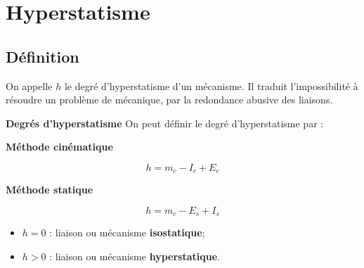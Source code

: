 \section{Hyperstatisme}
\subsection{Définition}
On appelle $h$ le degré d'hyperstatisme d'un mécanisme.
			Il traduit l'impossibilité à résoudre un problème de mécanique, par la redondance abusive des liaisons.
			
\begin{defi}\small{\textbf{\textsf{Degrés d'hyperstatisme}}}
On peut définir le degré d'hyperstatisme par :

\vspace{-.6cm}

\begin{multicols}{2}
\begin{center}
\textbf{Méthode cinématique}
\end{center}

\vspace{-.5cm}

$$
h=m_c-I_c+E_c
$$

\begin{center}
\textbf{Méthode statique} 
\end{center}

\vspace{-.5cm}

$$
h=m_c-E_s+I_s
$$

\end{multicols}
\begin{itemize}
\item $h=0$ : liaison ou mécanisme \textbf{isostatique};
\item $h>0$ : liaison ou mécanisme \textbf{hyperstatique}.
\end{itemize}
\end{defi}






